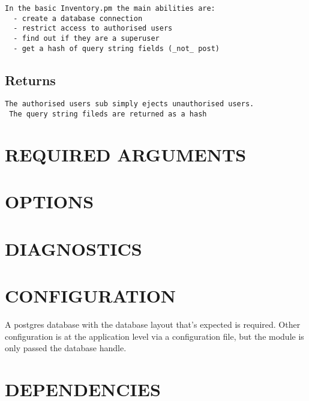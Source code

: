 \documentclass{book}
\begin{document}
\begin{Verbatim}[fontfamily=courier,gobble=1,frame=lines,fontsize=\small]
 In the basic Inventory.pm the main abilities are:
  - create a database connection
  - restrict access to authorised users
  - find out if they are a superuser
  - get a hash of query string fields (_not_ post)
\end{Verbatim}


\subsection{Returns}
\label{_Returns}
\hypertarget{_Returns}{}


\begin{Verbatim}[fontfamily=courier,gobble=1,frame=lines,fontsize=\small]
 The authorised users sub simply ejects unauthorised users.
 The query string fileds are returned as a hash
\end{Verbatim}


\section{REQUIRED ARGUMENTS}
\label{_REQUIRED_ARGUMENTS}
\hypertarget{_REQUIRED_ARGUMENTS}{}


\section{OPTIONS}
\label{_OPTIONS}
\hypertarget{_OPTIONS}{}


\section{DIAGNOSTICS}
\label{_DIAGNOSTICS}
\hypertarget{_DIAGNOSTICS}{}


\section{CONFIGURATION}
\label{_CONFIGURATION}
\hypertarget{_CONFIGURATION}{}



A postgres database with the database layout that's expected is required. Other configuration is at the application level via a configuration file, but the module is only passed the database handle.


\section{DEPENDENCIES}
\label{_DEPENDENCIES}
\hypertarget{_DEPENDENCIES}{}
\end{document}
